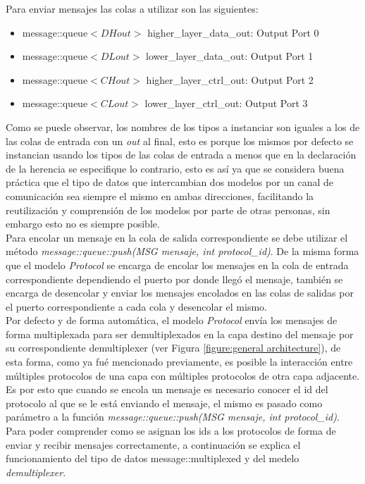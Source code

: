 \documentclass[10pt,a4paper]{article}
\begin{document}
Para enviar mensajes las colas a utilizar son las siguientes:
\begin{itemize}
\item message::queue$<DHout>$ higher\_layer\_data\_out: Output Port 0 
\item message::queue$<DLout>$ lower\_layer\_data\_out:  Output Port 1
\item message::queue$<CHout>$ higher\_layer\_ctrl\_out: Output Port 2
\item message::queue$<CLout>$ lower\_layer\_ctrl\_out:  Output Port 3
\end{itemize}

Como se puede observar, los nombres de los tipos a instanciar son iguales a los de las colas de entrada con un \textit{out} al final, esto es porque los mismos por defecto se instancian usando los tipos de las colas de entrada a menos que en la declaración de la herencia se especifique lo contrario, esto es así ya que se considera buena práctica que el tipo de datos que intercambian dos modelos por un canal de comunicación sea siempre el mismo en ambas direcciones, facilitando la reutilización y comprensión de los modelos por parte de otras personas, sin embargo esto no es siempre posible. \\

Para encolar un mensaje en la cola de salida correspondiente se debe utilizar el método \textit{message::queue::push(MSG mensaje, int protocol\_id)}. De la misma forma que el modelo \textit{Protocol} se encarga de encolar los mensajes en la cola de entrada correspondiente dependiendo el puerto por donde llegó el mensaje, también se encarga de desencolar y enviar los mensajes encolados en las colas de salidas por el puerto correspondiente a cada cola y desencolar el mismo. \\

Por defecto y de forma automática, el modelo \textit{Protocol} envía los mensajes de forma multiplexada para ser demultiplexados en la capa destino del mensaje por su correspondiente demultiplexer (ver Figura \ref{figure:general architecture}), de esta forma, como ya fué mencionado previamente, es posible la interacción entre múltiples protocolos de una capa con múltiples protocolos de otra capa adjacente. Es por esto que cuando se encola un mensaje es necesario conocer el id del protocolo al que se le está enviando el mensaje, el mismo es pasado como parámetro a la función \textit{message::queue::push(MSG mensaje, int protocol\_id)}. Para poder comprender como se asignan los ids a los protocolos de forma de enviar y recibir mensajes correctamente, a continuación se explica el funcionamiento del tipo de datos message::multiplexed y del medelo \textit{demultiplexer}. \\
\end{document}
